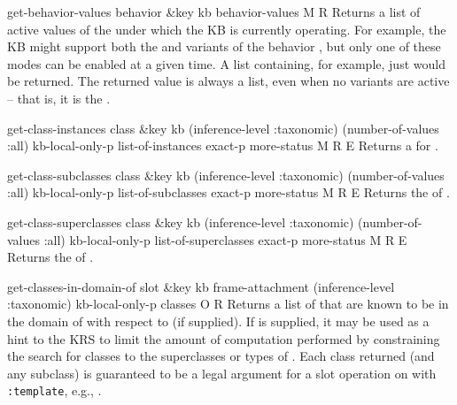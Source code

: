 \begin{okbcop}{get-behavior-values}{ behavior \&key kb} { behavior-values } { M } { R } {  }
Returns a list of active values of the  under
   which the KB is currently operating.  For example, the KB might support
   both the  and  variants of the behavior
   , but only one of these modes can be
   enabled at a given time.  A list containing, for example, just
    would be returned.
   The returned value  is always a list, even when
   no variants are active -- that is, it is the \emptylist.
\end{okbcop}

\begin{okbcop}{get-class-instances}{ class \&key kb (inference-level :taxonomic) (number-of-values :all) kb-local-only-p} { list-of-instances exact-p more-status } { M } { R } { E }
Returns a  for .
\end{okbcop}

\begin{okbcop}{get-class-subclasses}{ class \&key kb (inference-level :taxonomic) (number-of-values :all) kb-local-only-p} { list-of-subclasses exact-p more-status } { M } { R } { E }
Returns the  of .
\end{okbcop}

\begin{okbcop}{get-class-superclasses}{ class \&key kb (inference-level :taxonomic) (number-of-values :all) kb-local-only-p} { list-of-superclasses exact-p more-status } { M } { R } { E }
Returns the  of .
\end{okbcop}

\begin{okbcop}{get-classes-in-domain-of}{ slot \&key kb frame-attachment (inference-level :taxonomic) kb-local-only-p} { classes } { O } { R } {  }
Returns a list of  that are known to be in the domain of 
    with respect to  (if supplied).  If
    is supplied, it may be used as a hint to the KRS
   to limit the amount of computation performed by constraining the search
   for classes to the superclasses or types of .  
   Each class returned (and any subclass) is guaranteed to be a legal
    argument for a slot operation on  with
    {\tt :template}, e.g., .
\end{okbcop}

